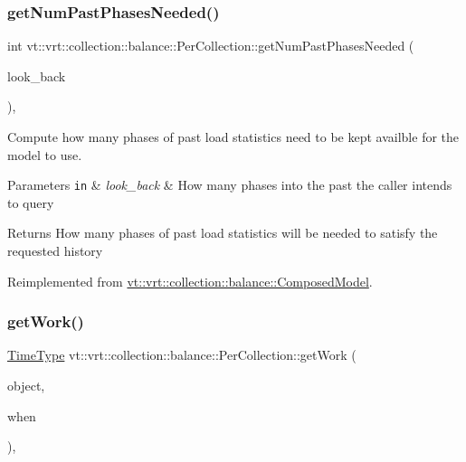 \subsubsection{\texorpdfstring{get\+Num\+Past\+Phases\+Needed()}{getNumPastPhasesNeeded()}}
{\footnotesize\ttfamily int vt\+::vrt\+::collection\+::balance\+::\+Per\+Collection\+::get\+Num\+Past\+Phases\+Needed (\begin{DoxyParamCaption}\item[{int}]{look\+\_\+back }\end{DoxyParamCaption})\hspace{0.3cm}{\ttfamily [override]}, {\ttfamily [virtual]}}



Compute how many phases of past load statistics need to be kept availble for the model to use. 


\begin{DoxyParams}[1]{Parameters}
\mbox{\tt in}  & {\em look\+\_\+back} & How many phases into the past the caller intends to query\\
\hline
\end{DoxyParams}
\begin{DoxyReturn}{Returns}
How many phases of past load statistics will be needed to satisfy the requested history 
\end{DoxyReturn}


Reimplemented from \hyperlink{classvt_1_1vrt_1_1collection_1_1balance_1_1_composed_model_a1fb8c98e3500be582095a54369661316}{vt\+::vrt\+::collection\+::balance\+::\+Composed\+Model}.

\mbox{\label{structvt_1_1vrt_1_1collection_1_1balance_1_1_per_collection_a39813c26fddb8c8cdd6996187f42c173}} 
\subsubsection{\texorpdfstring{get\+Work()}{getWork()}}
{\footnotesize\ttfamily \hyperlink{namespacevt_a876a9d0cd5a952859c72de8a46881442}{Time\+Type} vt\+::vrt\+::collection\+::balance\+::\+Per\+Collection\+::get\+Work (\begin{DoxyParamCaption}\item[{\hyperlink{namespacevt_1_1vrt_1_1collection_1_1balance_a14c8d2c972f2913aa3f1636e5be0a120}{Element\+I\+D\+Type}}]{object,  }\item[{\hyperlink{structvt_1_1vrt_1_1collection_1_1balance_1_1_phase_offset}{Phase\+Offset}}]{when }\end{DoxyParamCaption})\hspace{0.3cm}{\ttfamily [override]}, {\ttfamily [virtual]}}



